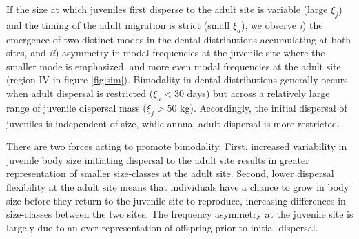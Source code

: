 \documentclass[]{rsos}%
\begin{document}
If the size at which juveniles first disperse to the adult site is variable (large $\xi_j$) and the timing of the adult migration is strict (small $\xi_a$), we observe \emph{i}) the emergence of two distinct modes in the dental distributions accumulating at both sites, and \emph{ii}) asymmetry in modal frequencies at the juvenile site where the smaller mode is emphasized, and more even modal frequencies at the adult site (region IV in figure \ref{fig:sim}).
Bimodality in dental distributions generally occurs when adult dispersal is restricted ($\xi_a < 30$ days) but across a relatively large range of juvenile dispersal mass ($\xi_j > 50$ kg).
Accordingly, the initial dispersal of juveniles is independent of size, while annual adult dispersal is more restricted.

There are two forces acting to promote bimodality.
First, increased variability in juvenile body size initiating dispersal to the adult site results in greater representation of smaller size-classes at the adult site.
Second, lower dispersal flexibility at the adult site means that individuals have a chance to grow in body size before they return to the juvenile site to reproduce, increasing differences in size-classes between the two sites.
The frequency asymmetry at the juvenile site is largely due to an over-representation of offspring prior to initial dispersal.
\end{document}
